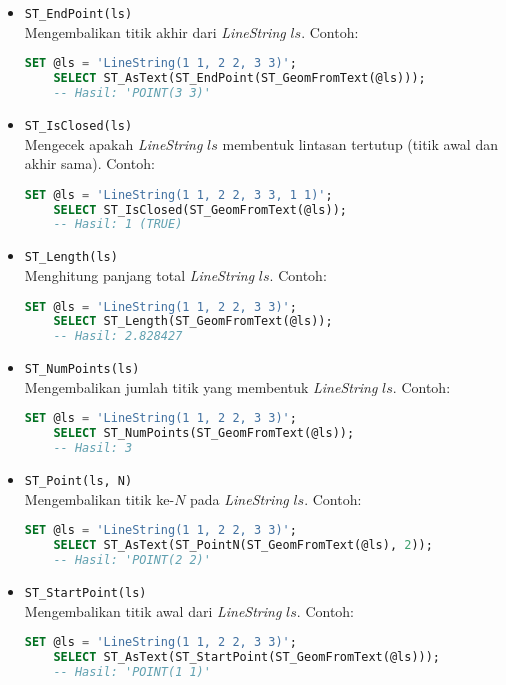 \begin{itemize}
    \item \texttt{ST\_EndPoint(ls)}
    \\ Mengembalikan titik akhir dari \textit{LineString} $ls$. Contoh:
    \begin{lstlisting}[language=SQL]
    SET @ls = 'LineString(1 1, 2 2, 3 3)';
    SELECT ST_AsText(ST_EndPoint(ST_GeomFromText(@ls))); 
    -- Hasil: 'POINT(3 3)'
    \end{lstlisting}
    
    \item \texttt{ST\_IsClosed(ls)}
    \\ Mengecek apakah \textit{LineString} $ls$ membentuk lintasan tertutup (titik awal dan akhir sama). Contoh: 
    \begin{lstlisting}[language=SQL]
    SET @ls = 'LineString(1 1, 2 2, 3 3, 1 1)';
    SELECT ST_IsClosed(ST_GeomFromText(@ls));
    -- Hasil: 1 (TRUE)
    \end{lstlisting}
    
    \item \texttt{ST\_Length(ls)}
    \\ Menghitung panjang total \textit{LineString} $ls$. Contoh: \begin{lstlisting}[language=SQL]
    SET @ls = 'LineString(1 1, 2 2, 3 3)';
    SELECT ST_Length(ST_GeomFromText(@ls));
    -- Hasil: 2.828427
    \end{lstlisting}

    \item \texttt{ST\_NumPoints(ls)}
    \\ Mengembalikan jumlah titik yang membentuk \textit{LineString} $ls$. Contoh: 
    \begin{lstlisting}[language=SQL]
    SET @ls = 'LineString(1 1, 2 2, 3 3)';
    SELECT ST_NumPoints(ST_GeomFromText(@ls));
    -- Hasil: 3
    \end{lstlisting}
    
    \item \texttt{ST\_Point(ls, N)}
    \\ Mengembalikan titik ke-$N$ pada \textit{LineString} $ls$. Contoh: \begin{lstlisting}[language=SQL]
    SET @ls = 'LineString(1 1, 2 2, 3 3)';
    SELECT ST_AsText(ST_PointN(ST_GeomFromText(@ls), 2));
    -- Hasil: 'POINT(2 2)'
    \end{lstlisting}
    
    \item \texttt{ST\_StartPoint(ls)}
    \\ Mengembalikan titik awal dari \textit{LineString} $ls$. Contoh: \begin{lstlisting}[language=SQL]
    SET @ls = 'LineString(1 1, 2 2, 3 3)';
    SELECT ST_AsText(ST_StartPoint(ST_GeomFromText(@ls)));
    -- Hasil: 'POINT(1 1)'
    \end{lstlisting}

\end{itemize}

